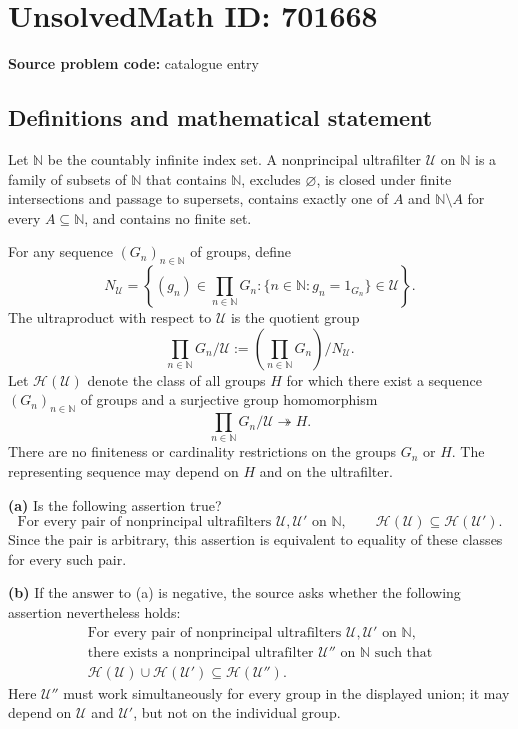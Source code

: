 \documentclass[11pt]{article}
\newcommand{\N}{\mathbb{N}}
\begin{document}
\section*{UnsolvedMath ID: 701668}
\textbf{Source problem code:} catalogue entry
\subsection{Definitions and mathematical statement}
Let \(\N\) be the countably infinite index set. A nonprincipal ultrafilter \(\mathscr U\) on \(\N\) is a family of subsets of \(\N\) that contains \(\N\), excludes \(\varnothing\), is closed under finite intersections and passage to supersets, contains exactly one of \(A\) and \(\N\setminus A\) for every \(A\subseteq\N\), and contains no finite set.

For any sequence \((G_n)_{n\in\N}\) of groups, define
\[
N_{\mathscr U}=\left\{(g_n)\in\prod_{n\in\N}G_n:\{n\in\N:g_n=1_{G_n}\}\in\mathscr U\right\}.
\]
The ultraproduct with respect to \(\mathscr U\) is the quotient group
\[
\prod_{n\in\N}G_n/\mathscr U
:=\left(\prod_{n\in\N}G_n\right)/N_{\mathscr U}.
\]
Let \(\mathcal H(\mathscr U)\) denote the class of all groups \(H\) for which there exist a sequence \((G_n)_{n\in\N}\) of groups and a surjective group homomorphism
\[
\prod_{n\in\N}G_n/\mathscr U\twoheadrightarrow H.
\]
There are no finiteness or cardinality restrictions on the groups \(G_n\) or \(H\). The representing sequence may depend on \(H\) and on the ultrafilter.

\textbf{(a)} Is the following assertion true?
\[
\text{For every pair of nonprincipal ultrafilters }\mathscr U,\mathscr U'\text{ on }\N,
\qquad \mathcal H(\mathscr U)\subseteq\mathcal H(\mathscr U').
\]
Since the pair is arbitrary, this assertion is equivalent to equality of these classes for every such pair.

\textbf{(b)} If the answer to (a) is negative, the source asks whether the following assertion nevertheless holds:
\[
\begin{gathered}
\text{For every pair of nonprincipal ultrafilters }\mathscr U,\mathscr U'\text{ on }\N,\\
\text{there exists a nonprincipal ultrafilter }\mathscr U''\text{ on }\N\text{ such that}\\
\mathcal H(\mathscr U)\cup\mathcal H(\mathscr U')
\subseteq\mathcal H(\mathscr U'').
\end{gathered}
\]
Here \(\mathscr U''\) must work simultaneously for every group in the displayed union; it may depend on \(\mathscr U\) and \(\mathscr U'\), but not on the individual group.
\end{document}
